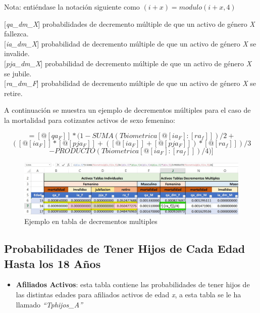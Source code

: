 \documentclass[
  letterpaper,
  DIV=11,
  numbers=noendperiod]{scrreprt}
\providecommand{\tightlist}{%
  \setlength{\itemsep}{0pt}\setlength{\parskip}{0pt}}\usepackage{longtable,booktabs,array}
\begin{document}
Nota: entiéndase la notación siguiente como \((i+x)=modulo(i+x,4)\)

{[}\emph{qa\_dm\_X}{]} probabilidades de decremento múltiple de que un
activo de género \emph{X} fallezca.\\
{[}\emph{ia\_dm\_X}{]} probabilidad de decremento múltiple de que un
activo de género \emph{X} se invalide.\\
{[}\emph{pja\_dm\_X}{]} probabilidad de decremento múltiple de que un
activo de género \emph{X} se jubile.\\
{[}\emph{ra\_dm\_F}{]} probabilidad de decremento múltiple de que un
activo de género \emph{X} se retire.

A continuación se muestra un ejemplo de decrementos múltiples para el
caso de la mortalidad para cotizantes activos de sexo femenino:

\[=[@[qa_F]]*(1-SUMA(Tbiometrica[@[ia_F]:[ra_f]])/2+\]
\[([@[ia_F]]*[@[pja_F]]+([@[ia_F]]+[@[pja_F]])*[@[ra_f]])/3\]
\[-PRODUCTO(Tbiometrica[@[ia_F]:[ra_f]])/4)]\]

\begin{figure}

{\centering \includegraphics[width=6.53125in,height=\textheight]{images/F/Img7.jpg}

}

\caption{Ejemplo en tabla de decrementos multiples}

\end{figure}

\hypertarget{probabilidades-de-tener-hijos-de-cada-edad-hasta-los-18-auxf1os}{%
\subsection{Probabilidades de Tener Hijos de Cada Edad Hasta los 18
Años}\label{probabilidades-de-tener-hijos-de-cada-edad-hasta-los-18-auxf1os}}

\begin{itemize}
\tightlist
\item
  \textbf{Afiliados Activos}: esta tabla contiene las probabilidades de
  tener hijos de las distintas edades para afiliados activos de edad
  \emph{x}, a esta tabla se le ha llamado \emph{``Tphijos\_A''}
\end{itemize}
\end{document}
